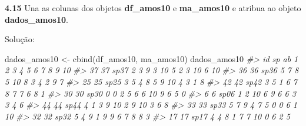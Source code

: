 \documentclass[
]{book}
\newenvironment{Shaded}{\begin{snugshade}}{\end{snugshade}}
\newcommand{\CommentTok}[1]{\textcolor[rgb]{0.56,0.35,0.01}{\textit{#1}}}
\newcommand{\FunctionTok}[1]{\textcolor[rgb]{0.00,0.00,0.00}{#1}}
\newcommand{\NormalTok}[1]{#1}
\newcommand{\OtherTok}[1]{\textcolor[rgb]{0.56,0.35,0.01}{#1}}
\newcommand{\SpecialCharTok}[1]{\textcolor[rgb]{0.00,0.00,0.00}{#1}}
\begin{document}
\begin{Shaded}
\end{Shaded}

\textbf{4.15}
Una as colunas dos objetos \textbf{df\_amos10} e \textbf{ma\_amos10} e atribua ao objeto \textbf{dados\_amos10}.

Solução:

\begin{Shaded}
\begin{Highlighting}[]
\NormalTok{dados\_amos10 }\OtherTok{\textless{}{-}} \FunctionTok{cbind}\NormalTok{(df\_amos10, ma\_amos10)}
\NormalTok{dados\_amos10}
\CommentTok{\#\textgreater{}    id   sp ab 1  2 3  4 5  6  7  8 9 10}
\CommentTok{\#\textgreater{} 37 37 sp37  2 3  9 3 10 5  2  3 10 6 10}
\CommentTok{\#\textgreater{} 36 36 sp36  5 7  8 5 10 8  3  4  2 9  7}
\CommentTok{\#\textgreater{} 25 25 sp25  3 5  4 8  5 9 10  4  3 1  8}
\CommentTok{\#\textgreater{} 42 42 sp42  3 5  1 6  7 8  7  7  6 8  1}
\CommentTok{\#\textgreater{} 30 30 sp30  0 0  2 5  6 6 10  9  6 5  0}
\CommentTok{\#\textgreater{} 6   6 sp06  1 2 10 6  9 6  6  3  3 4  6}
\CommentTok{\#\textgreater{} 44 44 sp44  4 1  3 9 10 2  9 10  3 6  8}
\CommentTok{\#\textgreater{} 33 33 sp33  5 7  9 4  7 5  0  0  6 1 10}
\CommentTok{\#\textgreater{} 32 32 sp32  5 4  9 1  9 9  6  7  8 8  3}
\CommentTok{\#\textgreater{} 17 17 sp17  4 4  8 1  7 7 10  0  6 2  5}
\end{Highlighting}
\end{Shaded}
\end{document}
